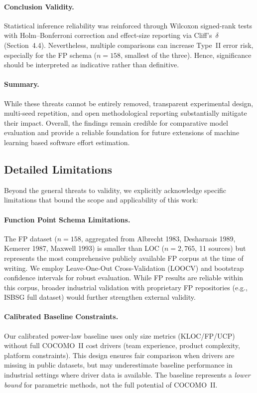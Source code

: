 \documentclass[11pt,a4paper]{article}
\begin{document}
\paragraph{Conclusion Validity.}
Statistical inference reliability was reinforced through 
Wilcoxon signed-rank tests with Holm–Bonferroni correction 
and effect-size reporting via Cliff’s~$\delta$ (Section~4.4).  
Nevertheless, multiple comparisons can increase Type~II error risk, 
especially for the FP schema ($n{=}158$, smallest of the three).  
Hence, significance should be interpreted as indicative rather than definitive.

\paragraph{Summary.}
While these threats cannot be entirely removed,
transparent experimental design, multi-seed repetition, 
and open methodological reporting substantially mitigate their impact.  
Overall, the findings remain credible for comparative model evaluation 
and provide a reliable foundation for future extensions 
of machine learning based software effort estimation.

\subsection{Detailed Limitations}

Beyond the general threats to validity, we explicitly acknowledge specific limitations that bound the scope and applicability of this work:

\paragraph{Function Point Schema Limitations.}
The FP dataset ($n=158$, aggregated from Albrecht 1983, Desharnais 1989, Kemerer 1987, Maxwell 1993) is smaller than LOC ($n=2{,}765$, 11 sources) but represents the most comprehensive publicly available FP corpus at the time of writing. We employ Leave-One-Out Cross-Validation (LOOCV) and bootstrap confidence intervals for robust evaluation. While FP results are reliable within this corpus, broader industrial validation with proprietary FP repositories (e.g., ISBSG full dataset) would further strengthen external validity.

\paragraph{Calibrated Baseline Constraints.}
Our calibrated power-law baseline uses only size metrics (KLOC/FP/UCP) without full COCOMO~II cost drivers (team experience, product complexity, platform constraints). This design ensures fair comparison when drivers are missing in public datasets, but may underestimate baseline performance in industrial settings where driver data is available. The baseline represents a \textit{lower bound} for parametric methods, not the full potential of COCOMO~II.
\end{document}
